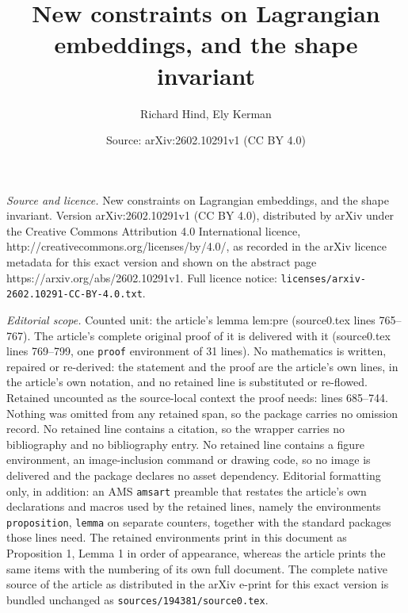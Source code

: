 \documentclass[10pt,a4paper]{amsart}
\title{New constraints on Lagrangian embeddings, and the shape invariant}
\author{Richard Hind, Ely Kerman}
\date{Source: arXiv:2602.10291v1 (CC BY 4.0)}
\begin{document}
\maketitle

\noindent\emph{Source and licence.} New constraints on Lagrangian embeddings, and the shape invariant. Version arXiv:2602.10291v1 (CC BY 4.0), distributed by arXiv under the Creative Commons Attribution 4.0 International licence, http://creativecommons.org/licenses/by/4.0/, as recorded in the arXiv licence metadata for this exact version and shown on the abstract page https://arxiv.org/abs/2602.10291v1. Full licence notice: \texttt{licenses/arxiv-2602.10291-CC-BY-4.0.txt}.\par\smallskip

\noindent\textit{Editorial scope.} Counted unit: the article's lemma lem:pre (source0.tex lines 765--767). The article's complete original proof of it is delivered with it (source0.tex lines 769--799, one \texttt{proof} environment of 31 lines). No mathematics is written, repaired or re-derived: the statement and the proof are the article's own lines, in the article's own notation, and no retained line is substituted or re-flowed.  Retained uncounted as the source-local context the proof needs: lines 685--744.  Nothing was omitted from any retained span, so the package carries no omission record.  No retained line contains a citation, so the wrapper carries no bibliography and no bibliography entry.  No retained line contains a figure environment, an image-inclusion command or drawing code, so no image is delivered and the package declares no asset dependency.  Editorial formatting only, in addition: an AMS \texttt{amsart} preamble that restates the article's own declarations and macros used by the retained lines, namely the environments \texttt{proposition}, \texttt{lemma} on separate counters, together with the standard packages those lines need.  The retained environments print in this document as Proposition 1, Lemma 1 in order of appearance, whereas the article prints the same items with the numbering of its own full document.  The complete native source of the article as distributed in the arXiv e-print for this exact version is bundled unchanged as \texttt{sources/194381/source0.tex}.
\end{document}
